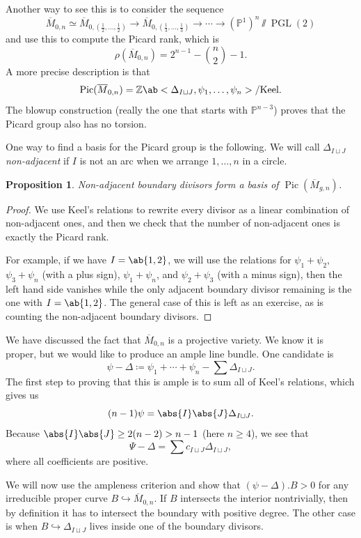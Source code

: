 \documentclass{amsart}
\newtheorem{prop}[thm]{Proposition}
\theoremstyle{definition}
\theoremstyle{remark}
\theoremstyle{plain}
\theoremstyle{definition}
\theoremstyle{remark}
\newcommand{\Z}{\mathbb{Z}}
\renewcommand{\P}{\mathbb{P}}
\newcommand{\on}[1]{\operatorname{#1}}
\newcommand{\ol}[1]{\overline{#1}}
\newcommand{\1}{\mathbf{1}}
\newcommand{\2}{\mathbf{2}}
\newcommand{\3}{\mathbf{3}}
\DeclareMathOperator{\Pic}{Pic}
\begin{document}
Another way to see this is to consider the sequence
\[ \ol{M}_{0,n} \simeq \ol{M}_{0, (\frac{1}{2}, \ldots, \frac{1}{2})} \to \ol{M}_{0, (\frac{1}{3}, \ldots, \frac{1}{3})} \to \cdots \to (\P^1)^n \sslash \on{PGL}(2) \]
and use this to compute the Picard rank, which is
\[ \rho(\ol{M}_{0,n}) = 2^{n-1} - \binom{n}{2} - 1. \]
A more precise description is that
\[ \Pic (\ol{M}_{0,n}) = \Z \ab<\Delta_{I \sqcup J}, \psi_1, \ldots, \psi_n> / \text{Keel}. \]
The blowup construction (really the one that starts with \(\P^{n-3}\)) proves that the Picard group also has no torsion.

One way to find a basis for the Picard group is the following. We will call \(\Delta_{I \sqcup J}\) \textit{non-adjacent} if \(I\) is not an arc when we arrange \(1, \ldots, n\) in a circle.

\begin{prop}
    Non-adjacent boundary divisors form a basis of \(\Pic(\ol{M}_{g,n})\).
\end{prop}

\begin{proof}
    We use Keel's relations to rewrite every divisor as a linear combination of non-adjacent ones, and then we check that the number of non-adjacent ones is exactly the Picard rank. 

    For example, if we have \(I = \ab\{1, 2\}\), we will use the relations for \(\psi_1 + \psi_2\), \(\psi_3 + \psi_n\) (with a plus sign), \(\psi_1 + \psi_n\), and \(\psi_2 + \psi_3\) (with a minus sign), then the left hand side vanishes while the only adjacent boundary divisor remaining is the one with \(I = \ab\{1,2\}\). The general case of this is left as an exercise, as is counting the non-adjacent boundary divisors.
\end{proof}

We have discussed the fact that \(\ol{M}_{0,n}\) is a projective variety. We know it is proper, but we would like to produce an ample line bundle. One candidate is
\[ \psi - \Delta \coloneqq \psi_1 + \cdots + \psi_n - \sum {\Delta_{I \sqcup J}}. \]
The first step to proving that this is ample is to sum all of Keel's relations, which gives us
\[ (n-1)\psi = \abs{I} \abs{J} \Delta_{I \sqcup J}. \]
Because \(\abs{I} \abs{J} \geq 2(n-2) > n-1\) (here \(n \geq 4\)), we see that
\[ \Psi - \Delta = \sum c_{I \sqcup J} \Delta_{I \sqcup J}, \]
where all coefficients are positive. 

We will now use the ampleness criterion and show that \((\psi - \Delta).B > 0\) for any irreducible proper curve \(B \hookrightarrow \ol{M}_{0,n}\). If \(B\) intersects the interior nontrivially, then by definition it has to intersect the boundary with positive degree. The other case is when \(B \hookrightarrow \Delta_{I \sqcup J}\) lives inside one of the boundary divisors.
\end{document}
